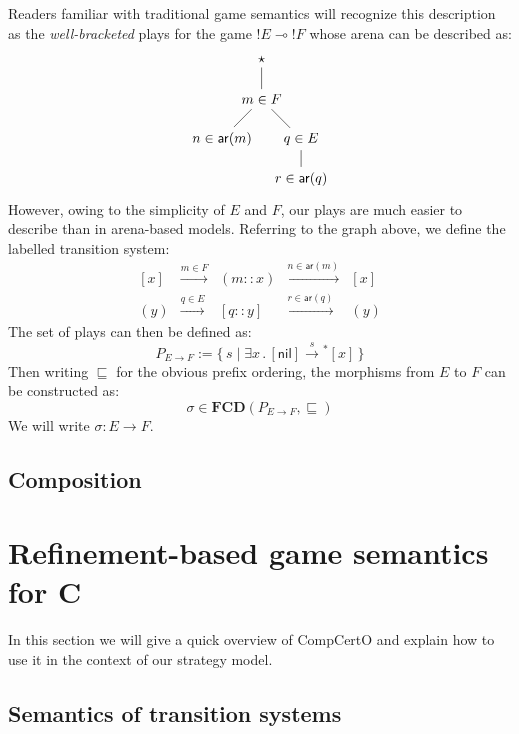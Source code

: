 \documentclass[format=sigplan,authordraft]{acmart}
\newcommand{\kw}[1]{\ensuremath{ \mathsf{#1} }}
\begin{document}
Readers familiar with traditional game semantics
will recognize this description
as the \emph{well-bracketed} plays for the game ${!}E \multimap {!}F$
whose arena can be described as:
\[
  \begin{tikzpicture}
    \node (S) at (0,3) {$\star$};
    \node (BQ) at (0,2) {$m \in F$};
    \node (BA) at (-1,1) {$n \in \kw{ar}(m)$};
    \node (AQ) at (+1,1) {$q \in E$};
    \node (AA) at (+1,0) {$r \in \kw{ar}(q)$};
    \path (S) edge (BQ);
    \path (BQ) edge (BA);
    \path (BQ) edge (AQ);
    \path (AQ) edge (AA);
  \end{tikzpicture}
\]
However,
owing to the simplicity of $E$ and $F$,
our plays are much easier to describe
than in arena-based models.
Referring to the graph above,
we define the labelled transition system:
\[
  \begin{array}{rcccl}
    [x] & \xrightarrow{m \in F} & (m :: x)
        & \xrightarrow{n \in \kw{ar}(m)} & [x] \\
    (y) & \xrightarrow{q \in E} & [q :: y]
        & \xrightarrow{r \in \kw{ar}(q)} & (y)
  \end{array}
\]
The set of plays can then be defined as:
\[
  P_{E \rightarrow F} :=
    \{ \, s \mid \exists x \,.\,
       [\kw{nil}] \mathrel{{\xrightarrow{s}}{}^*} [x] \, \}
\]
Then writing $\sqsubseteq$ for the
obvious prefix ordering,
the morphisms from $E$ to $F$
can be constructed as:
\[
    \sigma \in \mathbf{FCD}(P_{E \rightarrow F}, {\sqsubseteq})
\]
We will write $\sigma : E \rightarrow F$.

\subsection{Composition}







\section{Refinement-based game semantics for C} %

In this section we will give a quick overview of CompCertO
and explain how to use it in the context of our strategy model.

\subsection{Semantics of transition systems} %
\end{document}
